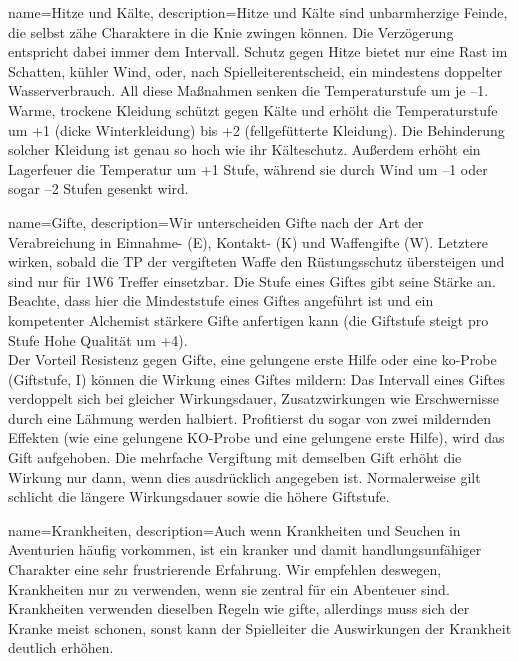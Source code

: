 {
    name={Hitze und Kälte},
    description={Hitze und Kälte sind unbarmherzige Feinde, die selbst zähe Charaktere in die Knie zwingen können. Die Verzögerung entspricht dabei immer dem Intervall. Schutz gegen Hitze bietet nur eine Rast im Schatten, kühler Wind, oder, nach Spielleiterentscheid, ein mindestens doppelter Wasserverbrauch. All diese Maßnahmen senken die Temperaturstufe um je –1. Warme, trockene Kleidung schützt gegen Kälte und erhöht die Temperaturstufe um +1 (dicke Winterkleidung) bis +2 (fellgefütterte Kleidung). Die Behinderung solcher Kleidung ist genau so hoch wie ihr Kälteschutz. Außerdem erhöht ein Lagerfeuer die Temperatur um +1 Stufe, während sie durch Wind um –1 oder sogar –2 Stufen gesenkt wird.}}

{
    name={Gifte},
    description={Wir unterscheiden Gifte nach der Art der Verabreichung in Einnahme- (E), Kontakt- (K) und Waffengifte (W). Letztere wirken, sobald die TP der vergifteten Waffe den Rüstungsschutz übersteigen und sind nur für 1W6 Treffer einsetzbar. Die Stufe eines Giftes gibt seine Stärke an. Beachte, dass hier die Mindeststufe eines Giftes angeführt ist und ein kompetenter Alchemist stärkere Gifte anfertigen kann (die Giftstufe steigt pro Stufe Hohe Qualität um +4).\\
Der Vorteil Resistenz gegen Gifte, eine gelungene erste Hilfe oder eine \gls{ko}-Probe (Giftstufe, I) können die Wirkung eines Giftes mildern: Das Intervall eines Giftes verdoppelt sich bei gleicher Wirkungsdauer, Zusatzwirkungen wie Erschwernisse durch eine Lähmung werden halbiert. Profitierst du sogar von zwei mildernden Effekten (wie eine gelungene KO-Probe und eine gelungene erste Hilfe), wird das Gift aufgehoben. Die mehrfache Vergiftung mit demselben Gift erhöht die Wirkung nur dann, wenn dies ausdrücklich angegeben ist. Normalerweise gilt schlicht die längere Wirkungsdauer sowie die höhere Giftstufe.}}

{
    name={Krankheiten},
    description={Auch wenn Krankheiten und Seuchen in Aventurien häufig vorkommen, ist ein kranker und damit handlungsunfähiger Charakter eine sehr frustrierende Erfahrung. Wir empfehlen deswegen, Krankheiten nur zu verwenden, wenn sie zentral für ein Abenteuer sind. Krankheiten verwenden dieselben Regeln wie \gls{gifte}, allerdings muss sich der Kranke meist schonen, sonst kann der Spielleiter die Auswirkungen der Krankheit deutlich erhöhen.}}
    
        
        
